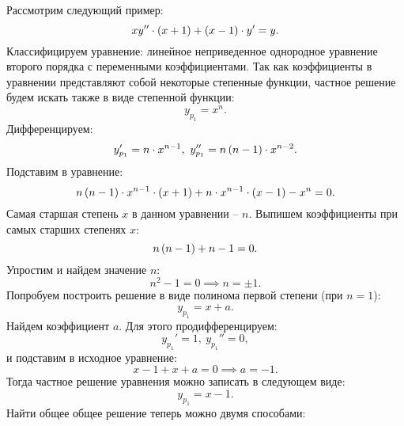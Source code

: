 		Рассмотрим следующий пример:
		\[ xy'' \cdot \left( x + 1 \right) + \left( x - 1 \right) \cdot y' = y. \]
		Классифицируем уравнение: линейное неприведенное однородное уравнение второго порядка с переменными коэффициентами. Так как коэффициенты в уравнении представляют собой некоторые степенные функции, частное решение будем искать также в виде степенной функции:
		\[ y_{p_1} = x^n. \]
		Дифференцируем:
		\[ y_{p_1}' = n \cdot x^{n-1}, ~ y_{p_1}'' = n \left( n-1 \right) \cdot x^{n-2}. \]
		Подставим в уравнение:
		\[ n \left( n-1 \right) \cdot x^{n-1} \cdot \left( x + 1 \right) + n \cdot x^{n-1} \cdot \left( x - 1 \right) - x^n = 0. \]
		Самая старшая степень $x$ в данном уравнении -- $n$. Выпишем коэффициенты при самых старших степенях $x$:
		\[ n \left( n - 1 \right) + n - 1 = 0. \]
		Упростим и найдем значение $n$:
		\[ n^2 - 1 = 0 \implies n = \pm 1. \]
		Попробуем построить решение в виде полинома первой степени (при $n = 1$):
		\[ y_{p_1} = x + a. \]
		Найдем коэффициент $a$. Для этого продифференцируем:
		\[ y_{p_1}' = 1, ~ y_{p_1}'' = 0, \]
		и подставим в исходное уравнение:
		\[ x - 1 + x + a = 0 \implies a = -1. \]
		Тогда частное решение уравнения можно записать в следующем виде:
		\[ y_{p_1} = x - 1. \]
		Найти общее общее решение теперь можно двумя способами:
